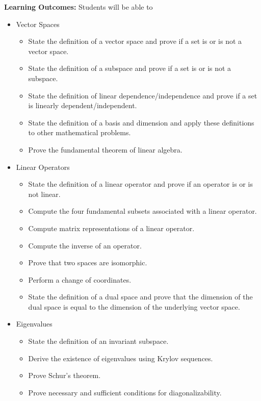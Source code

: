 \documentclass[11pt, a4paper]{article}
\begin{document}
\vspace*{.15in}
\noindent\textbf{Learning Outcomes:} Students will be able to
\begin{itemize}
\item Vector Spaces
    \begin{itemize}
    \item	State the definition of a vector space and prove if a set is or is not a vector space.
    \item	State the definition of a subspace and prove if a set is or is not a subspace.
    \item	State the definition of linear dependence/independence and prove if a set is linearly dependent/independent.
    \item	State the definition of a basis and dimension and apply these definitions to other mathematical problems.
    \item	Prove the fundamental theorem of linear algebra. 
    \end{itemize}
    
\item Linear Operators
    \begin{itemize}
    \item	State the definition of a linear operator and prove if an operator is or is not linear.
    \item	Compute the four fundamental subsets associated with a linear operator.
    \item	Compute matrix representations of a linear operator.
    \item	Compute the inverse of an operator.
    \item	Prove that two spaces are isomorphic.
    \item	Perform a change of coordinates. 
    \item	State the definition of a dual space and prove that the dimension of the dual space is equal to the dimension of the underlying vector space. 
    \end{itemize}
    
\item Eigenvalues
    \begin{itemize}
    \item	State the definition of an invariant subspace.
    \item	Derive the existence of eigenvalues using Krylov sequences.
    \item	Prove Schur's theorem.
    \item	Prove necessary and sufficient conditions for diagonalizability. 
    \end{itemize}  
    

\end{itemize}
\end{document}
